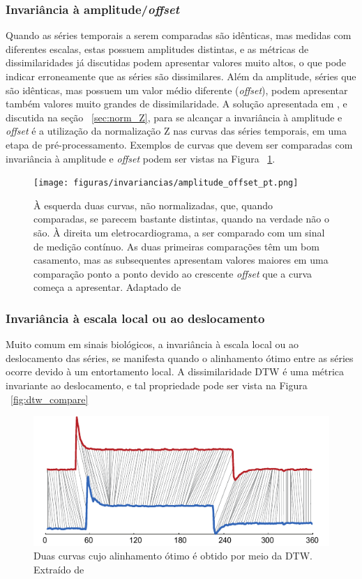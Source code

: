 \subsubsection{Invariância à amplitude/\emph{offset}}

Quando as séries temporais a serem comparadas são idênticas, mas medidas com diferentes escalas, estas possuem amplitudes distintas, e as métricas de dissimilaridades já discutidas podem apresentar valores muito altos, o que pode indicar erroneamente que as séries são dissimilares. Além da amplitude, séries que são idênticas, mas possuem um valor médio diferente (\emph{offset}), podem apresentar também valores muito grandes de dissimilaridade. A solução apresentada em \parencite{CID}, e discutida na seção ~\ref{sec:norm_Z}, para se alcançar a invariância à amplitude e \emph{offset} é a utilização da normalização Z nas curvas das séries temporais, em uma etapa de pré-processamento. Exemplos de curvas que devem ser comparadas com invariância à amplitude e \emph{offset} podem ser vistas na Figura ~\ref{fig:inv_offset_amplitude}.

\begin{figure}[h!]
	\texttt{[image: figuras/invariancias/amplitude\_offset\_pt.png]}
	\caption{À esquerda duas curvas, não normalizadas, que, quando comparadas, se parecem bastante distintas, quando na verdade não o são. À direita um eletrocardiograma, a ser comparado com um sinal de medição contínuo. As duas primeiras comparações têm um bom casamento, mas as subsequentes apresentam valores maiores em uma comparação ponto a ponto devido ao crescente \emph{offset} que a curva começa a apresentar. Adaptado de ~\parencite{CID}}
	\label{fig:inv_offset_amplitude}
\end{figure}

\subsubsection{Invariância à escala local ou ao deslocamento}

Muito comum em sinais biológicos, a invariância à escala local ou ao deslocamento das séries, se manifesta quando o alinhamento ótimo entre as séries ocorre devido à um entortamento local. A dissimilaridade DTW é uma métrica invariante ao deslocamento, e tal propriedade pode ser vista na Figura ~\ref{fig:dtw_compare}

\begin{figure}[h!]
	\includegraphics[width=\linewidth]{figuras/invariancias/deslocamento.png}
	\caption{Duas curvas cujo alinhamento ótimo é obtido por meio da DTW. Extraído de ~\parencite{CID}}
	\label{fig:inv_deslocamento}
\end{figure}


